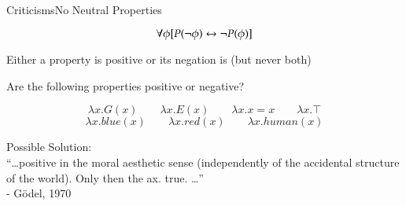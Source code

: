 \begin{frame}{Criticisms}{No Neutral Properties} \centering

$$\forall \phi [P(\neg \phi) \leftrightarrow \neg P(\phi)]$$

Either a property is positive or its negation is (but never both)
		  
\bigskip

Are the following properties positive or negative?

$$
\lambda x. G(x) \qquad \lambda x. E(x) \qquad \lambda x. x = x  \qquad  \lambda x. \top
$$
$$
\lambda x. blue(x) \qquad \lambda x. red(x) 
\qquad \lambda x. human(x)
$$



\bigskip

Possible Solution: \\
``\ldots positive in the moral aesthetic sense (independently of the accidental structure of the world). Only then the ax. true. \ldots''
\\ \hfill - G\"odel, 1970
\end{frame}


